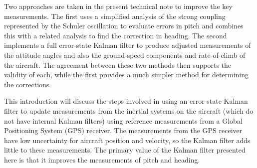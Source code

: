 \documentclass[12pt,twoside,english,12pt,twoside,english]{article}\usepackage[]{graphicx}\usepackage[]{color}
\let\OrgIndex\index
\renewcommand*{\index}[1]{\OrgIndex{#1}}
\begin{document}
Two approaches are taken in the present technical note to improve
the key measurements. The first uses
a simplified analysis of the strong coupling
represented by the Schuler oscillation
to evaluate errors in pitch
and combines this with a related analysis to find the correction in
heading. The second implements a full error-state Kalman filter
to produce adjusted measurements of the attitude angles
and also the ground-speed components
and rate-of-climb of the aircraft. The agreement between these two
methods then supports the validity of each, while the first provides
a much simpler method for determining the corrections.

This introduction will discuss the steps involved in using an error-state
Kalman filter to update measurements
from the inertial systems
on the aircraft (which do not
have internal Kalman filters) using reference measurements
from a Global
Positioning System (GPS) receiver.
The measurements from the GPS receiver have low uncertainty for aircraft
position and velocity, so the Kalman filter adds little to these measurements.
The primary value of the Kalman
filter presented here is that it improves the measurements of pitch
and heading.
\end{document}
